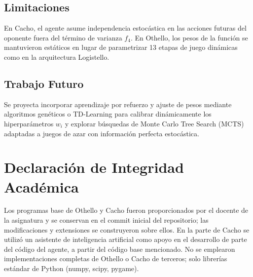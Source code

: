 \documentclass[10pt, a4paper]{article}
\begin{document}
\subsection{Limitaciones}
En Cacho, el agente asume independencia estocástica en las acciones futuras del oponente fuera del término de varianza $f_4$. En Othello, los pesos de la función se mantuvieron estáticos en lugar de parametrizar 13 etapas de juego dinámicas como en la arquitectura Logistello.

\subsection{Trabajo Futuro}
Se proyecta incorporar aprendizaje por refuerzo y ajuste de pesos mediante algoritmos genéticos o TD-Learning para calibrar dinámicamente los hiperparámetros $w_i$ y explorar búsquedas de Monte Carlo Tree Search (MCTS) adaptadas a juegos de azar con información perfecta estocástica.

\section*{Declaración de Integridad Académica}
Los programas base de Othello y Cacho fueron proporcionados por el docente de la asignatura y se conservan en el commit inicial del repositorio; las modificaciones y extensiones se construyeron sobre ellos. En la parte de Cacho se utilizó un asistente de inteligencia artificial \cite{anthropic2026claude} como apoyo en el desarrollo de parte del código del agente, a partir del código base mencionado. No se emplearon implementaciones completas de Othello o Cacho de terceros; solo librerías estándar de Python (numpy, scipy, pygame).



\end{document}
